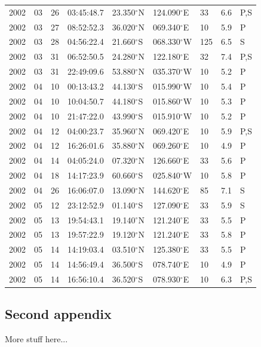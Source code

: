 \documentclass[12pt,twoside]{article}
\begin{document}
\begin{longtable}{|l|l|l|l|l|l|l|l|l|}
2002 & 03 & 26 & 03:45:48.7 & 23.350$^{\circ}$N & 124.090$^{\circ}$E &  33 & 6.6 & P,S \\
2002 & 03 & 27 & 08:52:52.3 & 36.020$^{\circ}$N & 069.340$^{\circ}$E &  10 & 5.9 & P   \\
2002 & 03 & 28 & 04:56:22.4 & 21.660$^{\circ}$S  & 068.330$^{\circ}$W & 125 & 6.5 & S   \\ 
2002 & 03 & 31 & 06:52:50.5 & 24.280$^{\circ}$N & 122.180$^{\circ}$E &  32 & 7.4 & P,S \\
2002 & 03 & 31 & 22:49:09.6 & 53.880$^{\circ}$N & 035.370$^{\circ}$W &  10 & 5.2 & P   \\
2002 & 04 & 10 & 00:13:43.2 & 44.130$^{\circ}$S  & 015.990$^{\circ}$W &  10 & 5.4 & P   \\
2002 & 04 & 10 & 10:04:50.7 & 44.180$^{\circ}$S  & 015.860$^{\circ}$W &  10 & 5.3 & P   \\
2002 & 04 & 10 & 21:47:22.0 & 43.990$^{\circ}$S  & 015.910$^{\circ}$W &  10 & 5.2 & P   \\
2002 & 04 & 12 & 04:00:23.7 & 35.960$^{\circ}$N & 069.420$^{\circ}$E &  10 & 5.9 & P,S \\
2002 & 04 & 12 & 16:26:01.6 & 35.880$^{\circ}$N & 069.260$^{\circ}$E &  10 & 4.9 & P   \\
2002 & 04 & 14 & 04:05:24.0 & 07.320$^{\circ}$N & 126.660$^{\circ}$E &  33 & 5.6 & P   \\
2002 & 04 & 18 & 14:17:23.9 & 60.660$^{\circ}$S  & 025.840$^{\circ}$W &  10 & 5.8 & P   \\
2002 & 04 & 26 & 16:06:07.0 & 13.090$^{\circ}$N & 144.620$^{\circ}$E &  85 & 7.1 & S   \\
2002 & 05 & 12 & 23:12:52.9 & 01.140$^{\circ}$S  & 127.090$^{\circ}$E &  33 & 5.9 & S   \\
2002 & 05 & 13 & 19:54:43.1 & 19.140$^{\circ}$N & 121.240$^{\circ}$E &  33 & 5.5 & P   \\
2002 & 05 & 13 & 19:57:22.9 & 19.120$^{\circ}$N & 121.240$^{\circ}$E &  33 & 5.8 & P   \\
2002 & 05 & 14 & 14:19:03.4 & 03.510$^{\circ}$N & 125.380$^{\circ}$E &  33 & 5.5 & P   \\
2002 & 05 & 14 & 14:56:49.4 & 36.500$^{\circ}$S  & 078.740$^{\circ}$E &  10 & 4.9 & P   \\
2002 & 05 & 14 & 16:56:10.4 & 36.520$^{\circ}$S  & 078.930$^{\circ}$E &  10 & 6.3 & P,S \\
\end{longtable}
\newpage

\newpage
\subsection{Second appendix}
More stuff here...


\newpage



\end{document}
